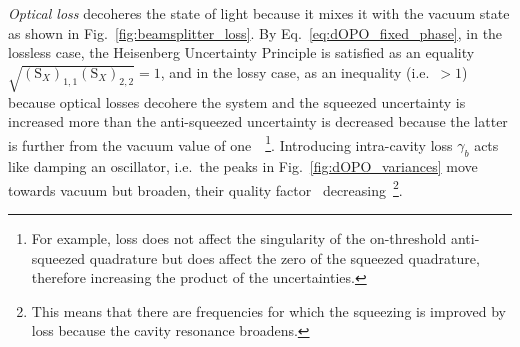 \emph{Optical loss} decoheres the state of light because it mixes it with the vacuum state as shown in Fig.~\ref{fig:beamsplitter_loss}.
By Eq.~\ref{eq:dOPO_fixed_phase}, in the lossless case, the Heisenberg Uncertainty Principle is satisfied as an equality $\sqrt{(\text{S}_X)_{1,1}(\text{S}_X)_{2,2}}=1$, and in the lossy case, as an inequality (i.e.\ $>1$) because optical losses decohere the system and the squeezed uncertainty is increased more than the anti-squeezed uncertainty is decreased because the latter is further from the vacuum value of one~\cite{}~\footnote{For example, loss does not affect the singularity of the on-threshold anti-squeezed quadrature but does affect the zero of the squeezed quadrature, therefore increasing the product of the uncertainties.}.
Introducing intra-cavity loss $\gamma_b$ acts like damping an oscillator, i.e.\ the peaks in Fig.~\ref{fig:dOPO_variances} move towards vacuum but broaden, their quality factor~\cite{} decreasing~\footnote{This means that there are frequencies for which the squeezing is improved by loss because the cavity resonance broadens.}.
